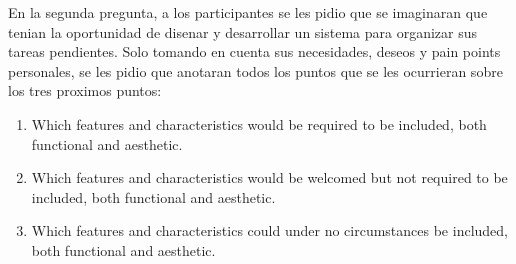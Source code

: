 En la segunda pregunta, a los participantes se les pidio que se imaginaran que tenian la oportunidad de disenar y desarrollar un sistema para organizar sus tareas pendientes. Solo tomando en cuenta sus necesidades, deseos y pain points personales, se les pidio que anotaran todos los puntos que se les ocurrieran sobre los tres proximos puntos:

\begin{enumerate}
    \item Which features and characteristics would be required to be included, both functional and aesthetic.
    \item Which features and characteristics would be welcomed but not required to be included, both functional and aesthetic.
    \item Which features and characteristics could under no circumstances be included, both functional and aesthetic.
\end{enumerate}

